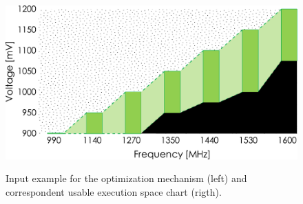 \begin{figure}[!htb]
    \begin{center}
        \begin{minipage}[t]{.5\textwidth}
            \vspace{0pt}
            \centering
        \end{minipage}%
        \begin{minipage}[t]{.45\textwidth}
            \vspace{0pt}
            \centering
            \includegraphics[width=\textwidth]{Figures/Optimization/UESex.pdf}
            \label{fig:uesex}
        \end{minipage}
    \end{center}
    \label{fig:input}
    \caption{Input example for the optimization mechanism (left) and correspondent usable execution space chart (rigth).}
\end{figure}





